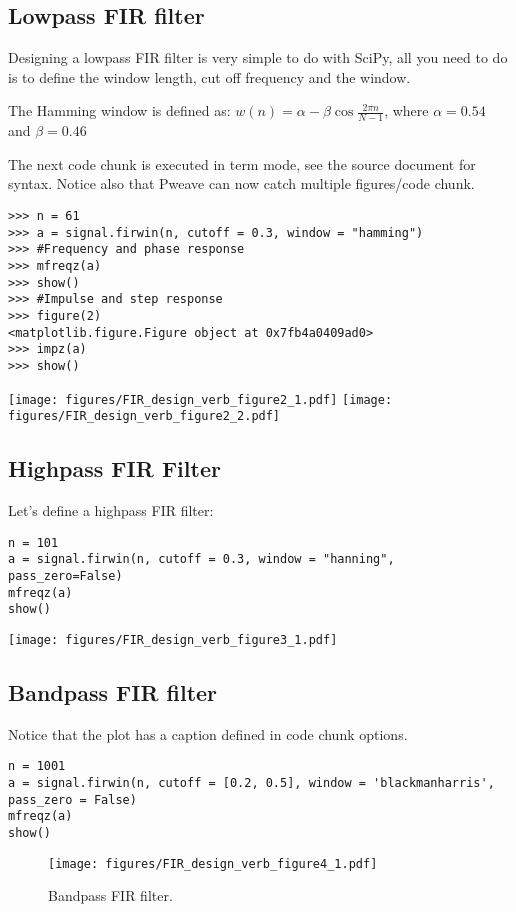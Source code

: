 \documentclass[a4paper,11pt,final]{article}
\begin{document}
\subsection{Lowpass FIR filter}

Designing a lowpass FIR filter is very simple to do with SciPy, all you
need to do is to define the window length, cut off frequency and the
window.

The Hamming window is defined as:
$w(n) = \alpha - \beta\cos\frac{2\pi n}{N-1}$, where $\alpha=0.54$ and
$\beta=0.46$

The next code chunk is executed in term mode, see the source document
for syntax. Notice also that Pweave can now catch multiple
figures/code chunk.


\begin{verbatim}
>>> n = 61
>>> a = signal.firwin(n, cutoff = 0.3, window = "hamming")
>>> #Frequency and phase response
>>> mfreqz(a)
>>> show()
>>> #Impulse and step response
>>> figure(2)
<matplotlib.figure.Figure object at 0x7fb4a0409ad0>
>>> impz(a)
>>> show()

\end{verbatim}
\texttt{[image: figures/FIR\_design\_verb\_figure2\_1.pdf]}
\texttt{[image: figures/FIR\_design\_verb\_figure2\_2.pdf]}


\subsection{Highpass FIR Filter}

Let's define a highpass FIR filter:


\begin{verbatim}
n = 101
a = signal.firwin(n, cutoff = 0.3, window = "hanning",
pass_zero=False)
mfreqz(a)
show()
\end{verbatim}
\texttt{[image: figures/FIR\_design\_verb\_figure3\_1.pdf]}


\subsection{Bandpass FIR filter}

Notice that the plot has a caption defined in code chunk options.



\begin{verbatim}
n = 1001
a = signal.firwin(n, cutoff = [0.2, 0.5], window = 'blackmanharris',
pass_zero = False)
mfreqz(a)
show()
\end{verbatim}
\begin{figure}[htpb]
\center
\texttt{[image: figures/FIR\_design\_verb\_figure4\_1.pdf]}
\caption{Bandpass FIR filter.}
\label{fig:None}
\end{figure}
\end{document}
